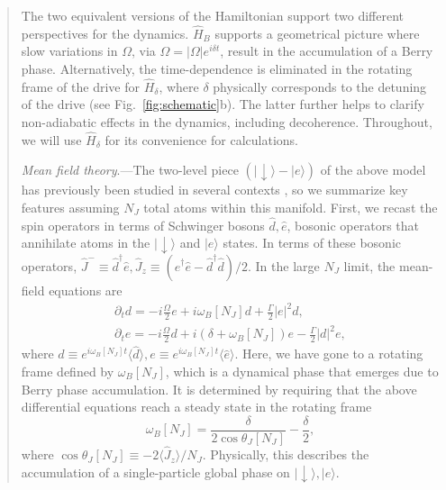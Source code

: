 \begin{abstract}
The two equivalent versions of the Hamiltonian support two different perspectives for the dynamics. $\hat H_B$ supports a geometrical picture where slow  variations in $\Omega$, via
$\Omega = |\Omega| e^{i \delta t}$,
result in the accumulation of a Berry phase. Alternatively, the time-dependence is eliminated in the rotating frame of the drive for $\hat H_\delta$, where $\delta$ physically corresponds to the detuning of the drive (see Fig.~\ref{fig:schematic}b). The latter further helps to clarify non-adiabatic effects in the dynamics, including decoherence. Throughout, we will use $\hat H_\delta$ for its convenience for calculations.

\emph{Mean field theory}.---The two-level piece $(|{\downarrow}\rangle-|e\rangle)$ of the above model has previously been studied in several contexts \cite{Drummond1978, Puri1980, Walls1980, Kilin1980, Iemini2018, Hannukainen2018, Barberena2019, Link2019, Somech2024, Barberena2024,Gonzalez-Tudela2013, Wolfe2014}, so we summarize key features assuming $N_J$ total atoms within this manifold. First, we recast the spin operators in terms of Schwinger bosons $\hat d, \hat e$, bosonic operators that annihilate atoms in the $|{\downarrow}\rangle$ and $|e\rangle$
states. In terms of these bosonic operators,  $\hat{J}^- \equiv \hat d^\dagger \hat e ,\hat{J}_z \equiv (\hat e^\dagger \hat e - \hat d^\dagger \hat d)/2$. In the large $N_J$ limit, the mean-field equations are
\begin{subequations}
    \begin{gather}
        \partial_t d = - i \frac{\Omega}{2} e + i \omega_B[N_J] d + \frac{\Gamma}{2} |e|^2 d,\\
        \partial_t e = - i \frac{\Omega}{2} d + i (\delta + \omega_B[N_J ]) e - \frac{\Gamma}{2} |d|^2 e,
    \end{gather}
\end{subequations}
where $d \equiv e^{i \omega_B[N_J] t} \langle \hat d\rangle, e \equiv e^{i \omega_B[N_J] t} \langle \hat e \rangle$. Here, we have gone to a rotating frame defined by $\omega_B[N_J]$, which is a dynamical phase that emerges due to Berry phase accumulation. It is determined by requiring that the above differential equations reach a steady state in the rotating frame \cite{suppcite}
\begin{equation}
    \omega_B[N_J ] = \frac{\delta}{2 \cos \theta_J[N_J]} - \frac{\delta}{2},
\end{equation}
where $\cos \theta_J[N_J] \equiv - 2\langle \hat J_z \rangle/N_J$. Physically, this describes the accumulation of a single-particle global phase on $|{\downarrow}\rangle, |e\rangle$.


\end{abstract}
